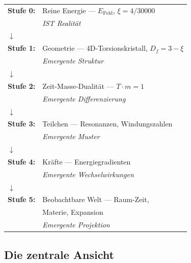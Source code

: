 	\begin{center}
		\begin{tabular}{ll}
			\textbf{Stufe 0:} & Reine Energie — $E_{\text{Feld}}$, $\xi = 4/30000$ \\
			& \textit{IST Realität} \\[0.3cm]
			$\downarrow$ & \\[0.3cm]
			\textbf{Stufe 1:} & Geometrie — 4D-Torsionskristall, $D_f = 3-\xi$ \\
			& \textit{Emergente Struktur} \\[0.3cm]
			$\downarrow$ & \\[0.3cm]
			\textbf{Stufe 2:} & Zeit-Masse-Dualität — $T \cdot m = 1$ \\
			& \textit{Emergente Differenzierung} \\[0.3cm]
			$\downarrow$ & \\[0.3cm]
			\textbf{Stufe 3:} & Teilchen — Resonanzen, Windungszahlen \\
			& \textit{Emergente Muster} \\[0.3cm]
			$\downarrow$ & \\[0.3cm]
			\textbf{Stufe 4:} & Kräfte — Energiegradienten \\
			& \textit{Emergente Wechselwirkungen} \\[0.3cm]
			$\downarrow$ & \\[0.3cm]
			\textbf{Stufe 5:} & Beobachtbare Welt — Raum-Zeit, \\ 
			& Materie, Expansion \\
			& \textit{Emergente Projektion} \\
		\end{tabular}
	\end{center}
	
	\subsection{Die zentrale Ansicht}
	
